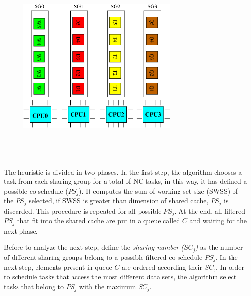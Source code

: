 \begin{description}
\begin{figure}[htbp]
\centering
{
\includegraphics[width=8cm,height=10cm, keepaspectratio]{images/possible_cosched.eps}
}
\caption{}
\label{fig:possible_cosched}
\end{figure}

The heuristic is divided in two phases. In the first step, the algorithm chooses a task from each sharing group for a total of NC tasks, in this way, it
has defined a possible co-schedule ($PS_j$). It computes the sum of working set size (SWSS) of the $PS_j$ selected, if SWSS is greater than dimension of 
shared cache, $PS_j$ is discarded. This procedure is repeated for all possible $PS_j$. At the end, all filtered $PS_j$ that fit into the shared cache are 
put in a queue called $C$ and waiting for the next phase.

Before to analyze the next step, define the \textit{sharing number ($SC_j$)} as the number of different sharing groups belong to a possible filtered 
co-schedule $PS_j$. In the next step, elements present in queue $C$ are ordered according their $SC_j$. In order to schedule tasks that access the most 
different data sets, the algorithm select tasks that belong to $PS_j$ with the maximum $SC_j$.


\end{description}
